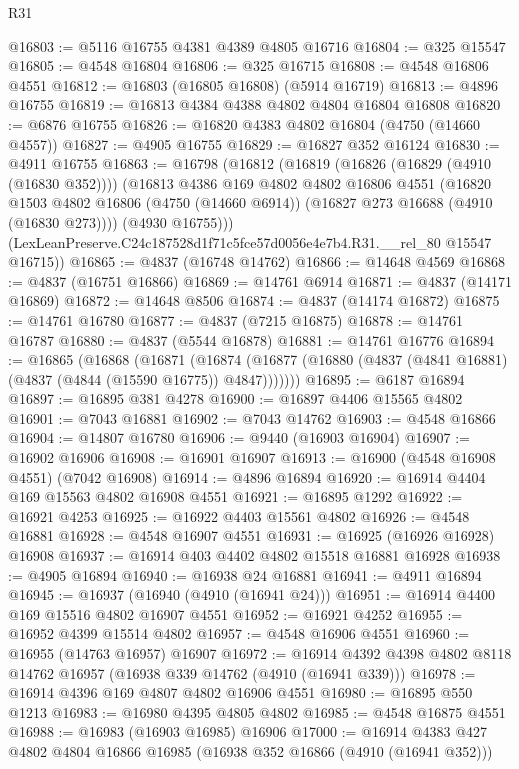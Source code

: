 \begin{lexlean}{R31}
\begin{coremodule}
@16803 := @5116 @16755 @4381 @4389 @4805 @16716
@16804 := @325 @15547
@16805 := @4548 @16804
@16806 := @325 @16715
@16808 := @4548 @16806 @4551
@16812 := @16803 (@16805 @16808) (@5914 @16719)
@16813 := @4896 @16755
@16819 := @16813 @4384 @4388 @4802 @4804 @16804 @16808
@16820 := @6876 @16755
@16826 := @16820 @4383 @4802 @16804 (@4750 (@14660 @4557))
@16827 := @4905 @16755
@16829 := @16827 @352 @16124
@16830 := @4911 @16755
@16863 := @16798
    (@16812
      (@16819
        (@16826 (@16829 (@4910 (@16830 @352))))
        (@16813
          @4386
          @169
          @4802
          @4802
          @16806
          @4551
          (@16820
            @1503
            @4802
            @16806
            (@4750 (@14660 @6914))
            (@16827 @273 @16688 (@4910 (@16830 @273))))
          (@4930 @16755)))
      (LexLeanPreserve.C24c187528d1f71c5fce57d0056e4e7b4.R31.__rel_80 @15547 @16715))
@16865 := @4837 (@16748 @14762)
@16866 := @14648 @4569
@16868 := @4837 (@16751 @16866)
@16869 := @14761 @6914
@16871 := @4837 (@14171 @16869)
@16872 := @14648 @8506
@16874 := @4837 (@14174 @16872)
@16875 := @14761 @16780
@16877 := @4837 (@7215 @16875)
@16878 := @14761 @16787
@16880 := @4837 (@5544 @16878)
@16881 := @14761 @16776
@16894 := @16865
    (@16868
      (@16871
        (@16874 (@16877 (@16880 (@4837 (@4841 @16881) (@4837 (@4844 (@15590 @16775)) @4847)))))))
@16895 := @6187 @16894
@16897 := @16895 @381 @4278
@16900 := @16897 @4406 @15565 @4802
@16901 := @7043 @16881
@16902 := @7043 @14762
@16903 := @4548 @16866
@16904 := @14807 @16780
@16906 := @9440 (@16903 @16904)
@16907 := @16902 @16906
@16908 := @16901 @16907
@16913 := @16900 (@4548 @16908 @4551) (@7042 @16908)
@16914 := @4896 @16894
@16920 := @16914 @4404 @169 @15563 @4802 @16908 @4551
@16921 := @16895 @1292
@16922 := @16921 @4253
@16925 := @16922 @4403 @15561 @4802
@16926 := @4548 @16881
@16928 := @4548 @16907 @4551
@16931 := @16925 (@16926 @16928) @16908
@16937 := @16914 @403 @4402 @4802 @15518 @16881 @16928
@16938 := @4905 @16894
@16940 := @16938 @24 @16881
@16941 := @4911 @16894
@16945 := @16937 (@16940 (@4910 (@16941 @24)))
@16951 := @16914 @4400 @169 @15516 @4802 @16907 @4551
@16952 := @16921 @4252
@16955 := @16952 @4399 @15514 @4802
@16957 := @4548 @16906 @4551
@16960 := @16955 (@14763 @16957) @16907
@16972 := @16914 @4392 @4398 @4802 @8118 @14762 @16957 (@16938 @339 @14762 (@4910 (@16941 @339)))
@16978 := @16914 @4396 @169 @4807 @4802 @16906 @4551
@16980 := @16895 @550 @1213
@16983 := @16980 @4395 @4805 @4802
@16985 := @4548 @16875 @4551
@16988 := @16983 (@16903 @16985) @16906
@17000 := @16914 @4383 @427 @4802 @4804 @16866 @16985 (@16938 @352 @16866 (@4910 (@16941 @352)))

\end{coremodule}
\end{lexlean}
